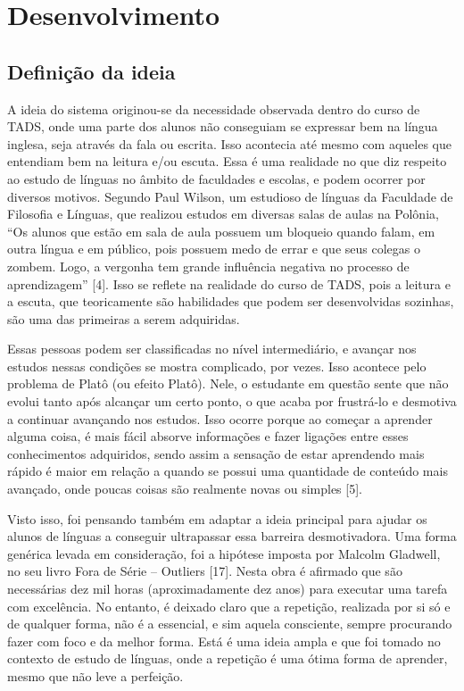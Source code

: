 \chapter{Desenvolvimento}

\section{Definição da ideia}

A ideia do sistema originou-se da necessidade observada dentro do curso de TADS, onde uma parte dos alunos não conseguiam se expressar bem na língua inglesa, seja através da fala ou escrita. Isso acontecia até mesmo com aqueles que entendiam bem na leitura e/ou escuta. Essa é uma realidade no que diz respeito ao estudo de línguas no âmbito de faculdades e escolas, e podem ocorrer por diversos motivos. Segundo Paul Wilson, um estudioso de línguas da Faculdade de Filosofia e Línguas, que realizou estudos em diversas salas de aulas na Polônia, “Os alunos que estão em sala de aula possuem um bloqueio quando falam, em outra língua e em público, pois possuem medo de errar e que seus colegas o zombem. Logo, a vergonha tem grande influência negativa no processo de aprendizagem” [4]. Isso se reflete na realidade do curso de TADS, pois a leitura e a escuta, que teoricamente são habilidades que podem ser desenvolvidas sozinhas, são uma das primeiras a serem adquiridas.

Essas pessoas podem ser classificadas no nível intermediário, e avançar nos estudos nessas condições se mostra complicado, por vezes. Isso acontece pelo problema de Platô (ou efeito Platô). Nele, o estudante em questão sente que não evolui tanto após alcançar um certo ponto, o que acaba por frustrá-lo e desmotiva a continuar avançando nos estudos. Isso ocorre porque ao começar a aprender alguma coisa, é mais fácil absorve informações e fazer ligações entre esses conhecimentos adquiridos, sendo assim a sensação de estar aprendendo mais rápido é maior em relação a quando se possui uma quantidade de conteúdo mais avançado, onde poucas coisas são realmente novas ou simples [5]. 

Visto isso, foi pensando também em adaptar a ideia principal para ajudar os alunos de línguas a conseguir ultrapassar essa barreira desmotivadora. Uma forma genérica levada em consideração, foi a hipótese imposta por Malcolm Gladwell, no seu livro Fora de Série – Outliers [17]. Nesta obra é afirmado que são necessárias dez mil horas (aproximadamente dez anos) para executar uma tarefa com excelência. No entanto, é deixado claro que a repetição, realizada por si só e de qualquer forma, não é a essencial, e sim aquela consciente, sempre procurando fazer com foco e da melhor forma. Está é uma ideia ampla e que foi tomado no contexto de estudo de línguas, onde a repetição é uma ótima forma de aprender, mesmo que não leve a perfeição.

